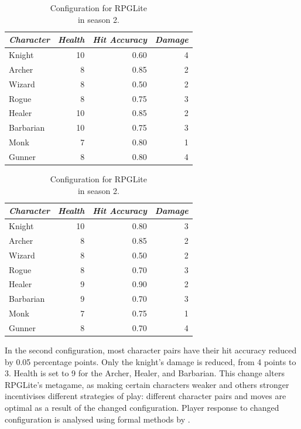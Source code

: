 \begin{table}[h]
  \begin{minipage}{.50\columnwidth}
    \centering
    \begin{tabular}{@{}l r r r@{}}
      \toprule
      \emph{Character} & \emph{Health} & \emph{Hit Accuracy} & \emph{Damage}\\
      \midrule
      Knight & 10 & 0.60 & 4 \\
      Archer & 8 & 0.85 & 2 \\
      Wizard & 8 & 0.50 & 2 \\
      Rogue & 8 & 0.75 & 3 \\
      Healer & 10 & 0.85 & 2 \\
      Barbarian & 10 & 0.75 & 3 \\
      Monk & 7 & 0.80 & 1 \\
      Gunner & 8 & 0.80 & 4 \\
      \bottomrule
    \end{tabular}
    \caption{Configuration for RPGLite\\in season 1.}
    \label{fig:s1_config}
  \end{minipage}%
  \begin{minipage}{.50\columnwidth}
    \centering
    \begin{tabular}{@{}l r r r@{}}
      \toprule
      \emph{Character} & \emph{Health} & \emph{Hit Accuracy} & \emph{Damage}\\
      \midrule
      Knight & 10 & 0.80 & 3 \\
      Archer & 8 & 0.85 & 2 \\
      Wizard & 8 & 0.50 & 2 \\
      Rogue & 8 & 0.70 & 3 \\
      Healer & 9 & 0.90 & 2 \\
      Barbarian & 9 & 0.70 & 3 \\
      Monk & 7 & 0.75 & 1 \\
      Gunner & 8 & 0.70 & 4 \\
      \bottomrule
    \end{tabular}
    \caption{Configuration for RPGLite\\in season 2.}
    \label{fig:s2_config}
  \end{minipage}
\label{fig:table_of_char_params_between_seasons}
\end{table}

In the second configuration, most character pairs have their hit accuracy
reduced by 0.05 percentage points. Only the knight's damage is reduced, from 4
points to 3. Health is set to 9 for the Archer, Healer, and Barbarian. This
change alters RPGLite's metagame, as making certain characters weaker and others
stronger incentivises different strategies of play: different character pairs
and moves are optimal as a result of the changed configuration. Player response
to changed configuration is analysed using formal methods by
\citet{kavanagh2021thesis}.


